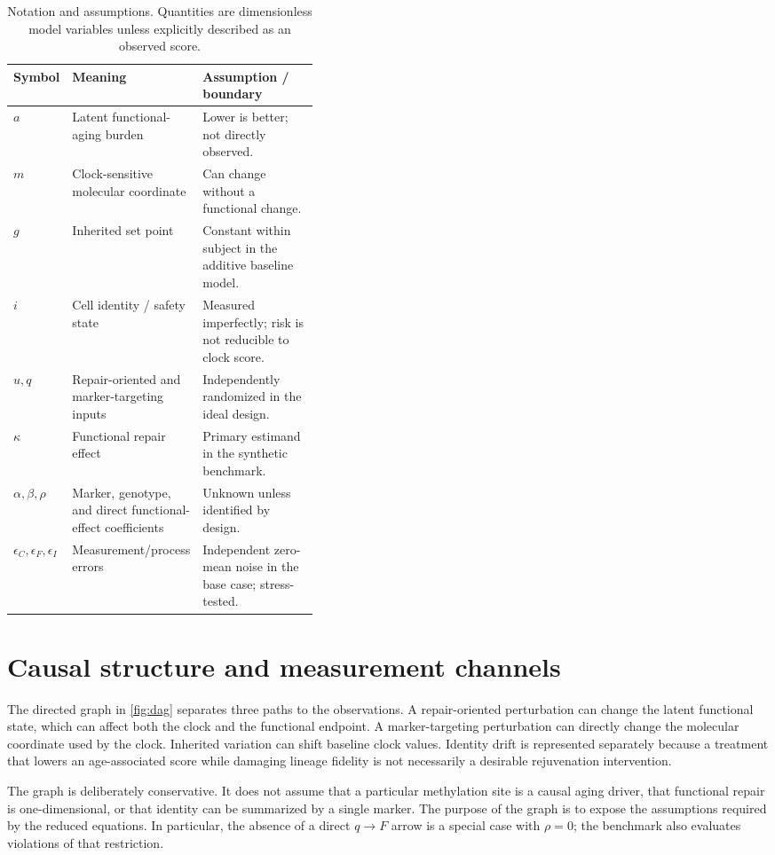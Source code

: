 \documentclass[10pt,a4paper]{article}
\begin{document}
\begin{table}[!htbp]
\centering
\caption{Notation and assumptions. Quantities are dimensionless model variables unless explicitly described as an observed score.}
\label{tab:notation}
\small
\begin{tabularx}{\linewidth}{p{0.13\linewidth} p{0.27\linewidth} X}
\toprule
\textbf{Symbol} & \textbf{Meaning} & \textbf{Assumption / boundary} \\
\midrule
\(a\) & Latent functional-aging burden & Lower is better; not directly observed. \\
\(m\) & Clock-sensitive molecular coordinate & Can change without a functional change. \\
\(g\) & Inherited set point & Constant within subject in the additive baseline model. \\
\(i\) & Cell identity / safety state & Measured imperfectly; risk is not reducible to clock score. \\
\(u,q\) & Repair-oriented and marker-targeting inputs & Independently randomized in the ideal design. \\
\(\kappa\) & Functional repair effect & Primary estimand in the synthetic benchmark. \\
\(\alpha,\beta,\rho\) & Marker, genotype, and direct functional-effect coefficients & Unknown unless identified by design. \\
\(\epsilon_C,\epsilon_F,\epsilon_I\) & Measurement/process errors & Independent zero-mean noise in the base case; stress-tested. \\
\bottomrule
\end{tabularx}
\end{table}

\section{Causal structure and measurement channels}
The directed graph in \cref{fig:dag} separates three paths to the observations. A repair-oriented perturbation can change the latent functional state, which can affect both the clock and the functional endpoint. A marker-targeting perturbation can directly change the molecular coordinate used by the clock. Inherited variation can shift baseline clock values. Identity drift is represented separately because a treatment that lowers an age-associated score while damaging lineage fidelity is not necessarily a desirable rejuvenation intervention.

The graph is deliberately conservative. It does not assume that a particular methylation site is a causal aging driver, that functional repair is one-dimensional, or that identity can be summarized by a single marker. The purpose of the graph is to expose the assumptions required by the reduced equations. In particular, the absence of a direct \(q\to F\) arrow is a special case with \(\rho=0\); the benchmark also evaluates violations of that restriction.
\end{document}
